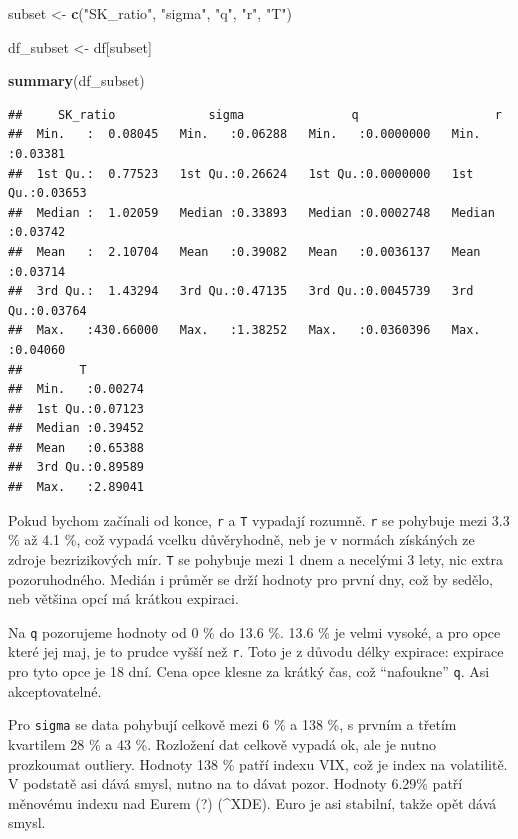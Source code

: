 \documentclass[
]{article}
\newenvironment{Shaded}{\begin{snugshade}}{\end{snugshade}}
\newcommand{\FunctionTok}[1]{\textcolor[rgb]{0.13,0.29,0.53}{\textbf{#1}}}
\newcommand{\NormalTok}[1]{#1}
\newcommand{\OtherTok}[1]{\textcolor[rgb]{0.56,0.35,0.01}{#1}}
\newcommand{\StringTok}[1]{\textcolor[rgb]{0.31,0.60,0.02}{#1}}
\begin{document}
\begin{Shaded}
\begin{Highlighting}[]
\NormalTok{subset }\OtherTok{\textless{}{-}} \FunctionTok{c}\NormalTok{(}\StringTok{"SK\_ratio"}\NormalTok{, }\StringTok{"sigma"}\NormalTok{, }\StringTok{"q"}\NormalTok{, }\StringTok{"r"}\NormalTok{, }\StringTok{"T"}\NormalTok{)}

\NormalTok{df\_subset }\OtherTok{\textless{}{-}}\NormalTok{ df[subset]}

\FunctionTok{summary}\NormalTok{(df\_subset)}
\end{Highlighting}
\end{Shaded}

\begin{verbatim}
##     SK_ratio             sigma               q                   r          
##  Min.   :  0.08045   Min.   :0.06288   Min.   :0.0000000   Min.   :0.03381  
##  1st Qu.:  0.77523   1st Qu.:0.26624   1st Qu.:0.0000000   1st Qu.:0.03653  
##  Median :  1.02059   Median :0.33893   Median :0.0002748   Median :0.03742  
##  Mean   :  2.10704   Mean   :0.39082   Mean   :0.0036137   Mean   :0.03714  
##  3rd Qu.:  1.43294   3rd Qu.:0.47135   3rd Qu.:0.0045739   3rd Qu.:0.03764  
##  Max.   :430.66000   Max.   :1.38252   Max.   :0.0360396   Max.   :0.04060  
##        T          
##  Min.   :0.00274  
##  1st Qu.:0.07123  
##  Median :0.39452  
##  Mean   :0.65388  
##  3rd Qu.:0.89589  
##  Max.   :2.89041
\end{verbatim}

Pokud bychom začínali od konce, \texttt{r} a \texttt{T} vypadají
rozumně. \texttt{r} se pohybuje mezi 3.3 \% až 4.1 \%, což vypadá vcelku
důvěryhodně, neb je v normách získáných ze zdroje bezrizikových mír.
\texttt{T} se pohybuje mezi 1 dnem a necelými 3 lety, nic extra
pozoruhodného. Medián i průměr se drží hodnoty pro první dny, což by
sedělo, neb většina opcí má krátkou expiraci.

Na \texttt{q} pozorujeme hodnoty od 0 \% do 13.6 \%. 13.6 \% je velmi
vysoké, a pro opce které jej maj, je to prudce vyšší než \texttt{r}.
Toto je z důvodu délky expirace: expirace pro tyto opce je 18 dní. Cena
opce klesne za krátký čas, což ``nafoukne'' \texttt{q}. Asi
akceptovatelné.

Pro \texttt{sigma} se data pohybují celkově mezi 6 \% a 138 \%, s prvním
a třetím kvartilem 28 \% a 43 \%. Rozložení dat celkově vypadá ok, ale
je nutno prozkoumat outliery. Hodnoty 138 \% patří indexu VIX, což je
index na volatilitě. V podstatě asi dává smysl, nutno na to dávat pozor.
Hodnoty 6.29\% patří měnovému indexu nad Eurem (?) (\^{}XDE). Euro je
asi stabilní, takže opět dává smysl.
\end{document}
